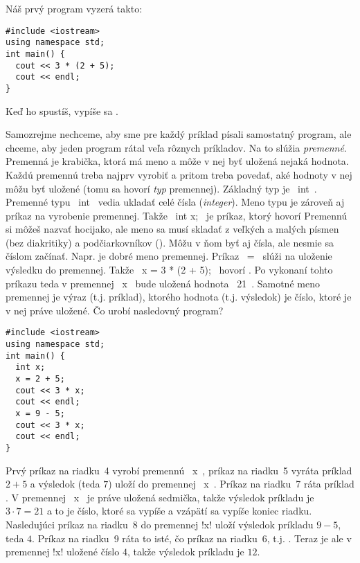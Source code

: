 Náš prvý program vyzerá takto:

\begin{lstlisting}
#include <iostream>
using namespace std;
int main() {
  cout << 3 * (2 + 5);
  cout << endl;
}
\end{lstlisting}

Keď ho spustíš, vypíše sa .

Samozrejme nechceme, aby sme pre každý príklad písali samostatný program, ale chceme,
aby jeden program rátal veľa rôznych príkladov. Na to slúžia {\em premenné}. Premenná
je krabička, ktorá má meno a môže v nej byť uložená nejaká hodnota. Každú premennú treba
najprv vyrobiť a pritom treba povedať, aké hodnoty v nej môžu byť uložené (tomu sa hovorí
{\em typ} premennej). Základný typ je \prg~int~. Premenné typu \prg~int~ vedia ukladať celé 
čísla ({\em integer}). Meno typu je zároveň aj príkaz na vyrobenie premennej.
Takže \prg~int x;~ je príkaz, ktorý hovorí  Premennú si môžeš nazvať hocijako, ale
meno sa musí skladať z veľkých a malých písmen (bez diakritiky) a podčiarkovníkov (\vb{\_}).
Môžu v ňom byť aj čísla, ale nesmie sa číslom začínať. Napr.  je
dobré meno premennej. Príkaz \prg~=~ slúži na uloženie
výsledku do premennej. Takže \prg~x = 3 * (2 + 5);~ hovorí . Po vykonaní tohto príkazu
teda v premennej \prg~x~ bude uložená hodnota \prg~21~. Samotné meno premennej
je výraz (t.j. príklad), ktorého hodnota (t.j. výsledok) je číslo, 
ktoré je v nej práve uložené. Čo urobí nasledovný program?

\begin{lstlisting}
#include <iostream>
using namespace std;
int main() {
  int x;
  x = 2 + 5;
  cout << 3 * x;
  cout << endl;
  x = 9 - 5;
  cout << 3 * x;
  cout << endl;
}
\end{lstlisting}

Prvý príkaz na riadku~4 vyrobí premennú \prg~x~, príkaz na riadku~5
vyráta príklad $2+5$ a výsledok (teda $7$)
uloží do premennej \prg~x~. Príkaz na riadku~7 ráta príklad 
. V premennej \prg~x~ je práve uložená sedmička, takže výsledok príkladu je 
$3\cdot7=21$ a to je číslo, ktoré sa vypíše a vzápätí sa vypíše koniec riadku.
Nasledujúci príkaz na riadku~8 do premennej \prg!x! uloží výsledok príkladu $9-5$, teda $4$. 
Príkaz na riadku~9 ráta to isté, čo príkaz na riadku~6, t.j.
. Teraz je ale v premennej \prg!x! uložené
číslo $4$, takže výsledok príkladu je $12$.


